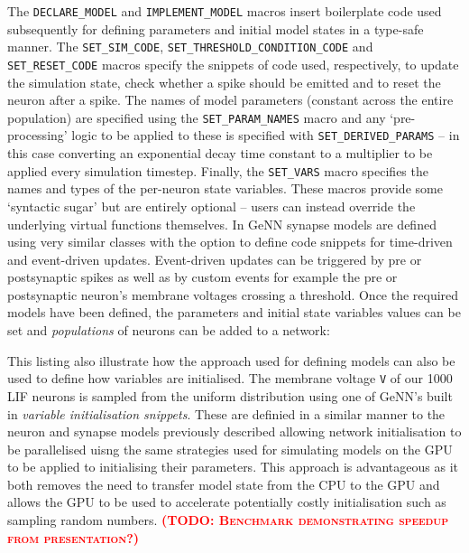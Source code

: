 \documentclass[utf8]{frontiersSCNS} %
\newcommand{\todo}[1]{\textbf{\textsc{\textcolor{red}{(TODO: #1)}}}}
\begin{document}
The \lstinline{DECLARE_MODEL} and \lstinline{IMPLEMENT_MODEL} macros insert boilerplate code used subsequently for defining parameters and initial model states in a type-safe manner.
The \lstinline{SET_SIM_CODE}, \lstinline{SET_THRESHOLD_CONDITION_CODE} and \lstinline{SET_RESET_CODE} macros specify the snippets of code used, respectively, to update the simulation state, check whether a spike should be emitted and to reset the neuron after a spike.
The names of model parameters (constant across the entire population) are specified using the \lstinline{SET_PARAM_NAMES} macro and any `pre-processing' logic to be applied to these is specified with \lstinline{SET_DERIVED_PARAMS} -- in this case converting an exponential decay time constant to a multiplier to be applied every simulation timestep.
Finally, the \lstinline{SET_VARS} macro specifies the names and types of the per-neuron state variables.
These macros provide some `syntactic sugar' but are entirely optional -- users can instead override the underlying virtual functions themselves.
In GeNN synapse models are defined using very similar classes with the option to define code snippets for time-driven and event-driven updates.
Event-driven updates can be triggered by pre or postsynaptic spikes as well as by custom events for example the pre or postsynaptic neuron's membrane voltages crossing a threshold.
Once the required models have been defined, the parameters and initial state variables values can be set and \textit{populations} of neurons can be added to a network:
%


This listing also illustrate how the approach used for defining models can also be used to define how variables are initialised.
The membrane voltage \lstinline{V} of our \num{1000} LIF neurons is sampled from the uniform distribution using one of GeNN's built in \textit{variable initialisation snippets}.
These are definied in a similar manner to the neuron and synapse models previously described allowing network initialisation to be parallelised uisng the same strategies used for simulating models on the GPU to be applied to initialising their parameters.
This approach is advantageous as it both removes the need to transfer model state from the CPU to the GPU and allows the GPU to be used to accelerate potentially costly initialisation such as sampling random numbers.
\todo{Benchmark demonstrating speedup from presentation?}
\end{document}
